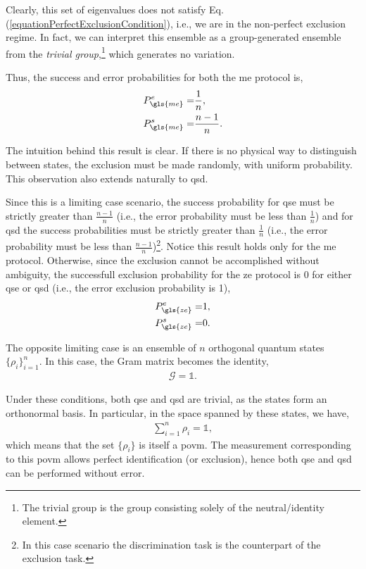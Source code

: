 \documentclass[12pt,letterpaper]{article}
\begin{document}
\begin{multicols}{2}
Clearly, this set of eigenvalues does not satisfy Eq. (\ref{equationPerfectExclusionCondition}), i.e., we are in the non-perfect exclusion regime. In fact, we can interpret this ensemble as a group-generated ensemble from the \emph{trivial group},\footnote{The trivial group is the group consisting solely of the neutral/identity element.} which generates no variation.

Thus, the success and error probabilities for both the \gls{me} protocol is,
\begin{align*}
	P_{\gls{me}}^e =& \frac{1}{n},\\
	P_{\gls{me}}^s =& \frac{n-1}{n}.
\end{align*}

The intuition behind this result is clear. If there is no physical way to distinguish between states, the exclusion must be made randomly, with uniform probability. This observation also extends naturally to \gls{qsd}.

Since this is a limiting case scenario, the success probability for \gls{qse} must be strictly greater than $\frac{n-1}{n}$ (i.e., the error probability must be less than $\frac{1}{n}$) and for \gls{qsd} the success probabilities must be strictly greater than $\frac{1}{n}$ (i.e., the error probability must be less than $\frac{n-1}{n}$)\footnote{In this case scenario the discrimination task is the counterpart of the exclusion task.}. Notice this result holds only for the \gls{me} protocol. Otherwise, since the exclusion cannot be accomplished without ambiguity, the successfull exclusion probability for the \gls{ze} protocol is 0 for either \gls{qse} or \gls{qsd} (i.e., the error exclusion probability is 1), 
\begin{align*}
	P_{\gls{ze}}^e =& 1,\\
	P_{\gls{ze}}^s =& 0.
\end{align*}

The opposite limiting case is an ensemble of $n$ orthogonal quantum states $\{\rho_i\}_{i=1}^{n}$. In this case, the Gram matrix becomes the identity,
\begin{align*}
	\mathcal{G} = \mathds{1}.
\end{align*}

Under these conditions, both \gls{qse} and \gls{qsd} are trivial, as the states form an orthonormal basis. In particular, in the space spanned by these states, we have,
\begin{align*}
	\sum_{i=1}^{n} \rho_i = \mathds{1},
\end{align*}
which means that the set $\{\rho_i\}$ is itself a \gls{povm}. The measurement corresponding to this \gls{povm} allows perfect identification (or exclusion), hence both \gls{qse} and \gls{qsd} can be performed without error.


\end{multicols}
\end{document}
